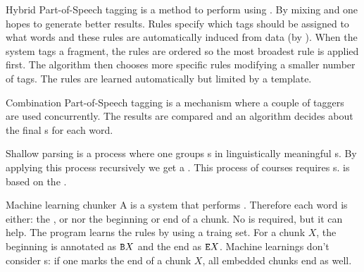 \begin{df}{Hybrid Part-of-Speech tagging}
\sb{} is a method to perform  using . By mixing  and  one hopes to generate better results. Rules specify which tags should be assigned to what words and these rules are automatically induced from data (by ). When the system tags a fragment, the rules are ordered so the most broadest rule is applied first. The algorithm then chooses more specific rules modifying a smaller number of tags. The rules are learned automatically but limited by a template.
\end{df}
\begin{df}{Combination Part-of-Speech tagging}
\sb{} is a  mechanism where a couple of taggers are used concurrently. The results are compared and an algorithm decides about the final s for each word.
\end{df}
\begin{df}[Chunking]{Shallow parsing}
\sb{} is a process where one groups s in linguistically meaningful s. By applying this process recursively we get a . This process of courses requires s. \sb{} is based on the .
\end{df}
\begin{df}{Machine learning chunker}
A \sb{} is a system that performs . Therefore each word is either: the ,  or nor the beginning or end of a chunk. No  is required, but it can help. The program learns the rules by using a traing set. For a chunk $X$, the beginning is annotated as $\mbox{\texttt{B}}X$ and the end as $\mbox{\texttt{E}}X$. Machine learnings don't consider s: if one marks the end of a chunk $X$, all embedded chunks end as well.
\end{df}